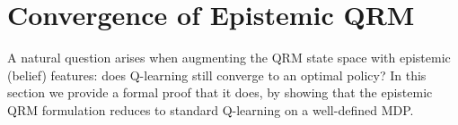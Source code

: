 \documentclass[11pt]{article}
\begin{document}



\section{Convergence of Epistemic QRM}
\label{sec:convergence}

A natural question arises when augmenting the QRM state space with epistemic (belief) features: does Q-learning still converge to an optimal policy?
In this section we provide a formal proof that it does, by showing that the epistemic QRM formulation reduces to standard Q-learning on a well-defined MDP.

\end{document}
